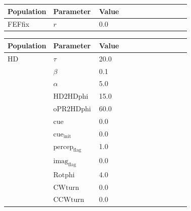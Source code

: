 \documentclass{article}
\begin{document}
\noindent
\begin{tabularx}{\linewidth}{|p{0.25\linewidth}|p{0.25\linewidth}|X|}\hline
\textbf{Population} & \textbf{Parameter} & \textbf{Value}   \\ \hline

    FEFfix             & $r$        & 0.0  \\ \hline

\end{tabularx}

\vspace{2ex}

\noindent
\begin{tabularx}{\linewidth}{|p{0.25\linewidth}|p{0.25\linewidth}|X|}\hline
\textbf{Population} & \textbf{Parameter} & \textbf{Value}   \\ \hline

    HD             & $\tau$        & 20.0  \\ \hline

                 & $\beta$        & 0.1  \\ \hline

                 & $\alpha$        & 5.0  \\ \hline

                 & ${\text{HD2HDphi}}$        & 15.0  \\ \hline

                 & ${\text{oPR2HDphi}}$        & 60.0  \\ \hline

                 & ${\text{cue}}$        & 0.0  \\ \hline

                 & ${\text{cue}}_{\text{init}}$        & 0.0  \\ \hline

                 & ${\text{percep}}_{\text{flag}}$        & 1.0  \\ \hline

                 & ${\text{imag}}_{\text{flag}}$        & 0.0  \\ \hline

                 & ${\text{Rotphi}}$        & 4.0  \\ \hline

                 & ${\text{CWturn}}$        & 0.0  \\ \hline

                 & ${\text{CCWturn}}$        & 0.0  \\ \hline

\end{tabularx}
\end{document}
